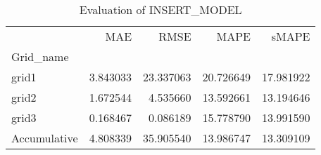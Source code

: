 \begin{table}
\centering
\caption{Evaluation of INSERT_MODEL}
\begin{tabular}{lrrrr}
\toprule
{} &       MAE &       RMSE &       MAPE &      sMAPE \\
Grid\_name    &           &            &            &            \\
\midrule
grid1        &  3.843033 &  23.337063 &  20.726649 &  17.981922 \\
grid2        &  1.672544 &   4.535660 &  13.592661 &  13.194646 \\
grid3        &  0.168467 &   0.086189 &  15.778790 &  13.991590 \\
Accumulative &  4.808339 &  35.905540 &  13.986747 &  13.309109 \\
\bottomrule
\end{tabular}
\end{table}
